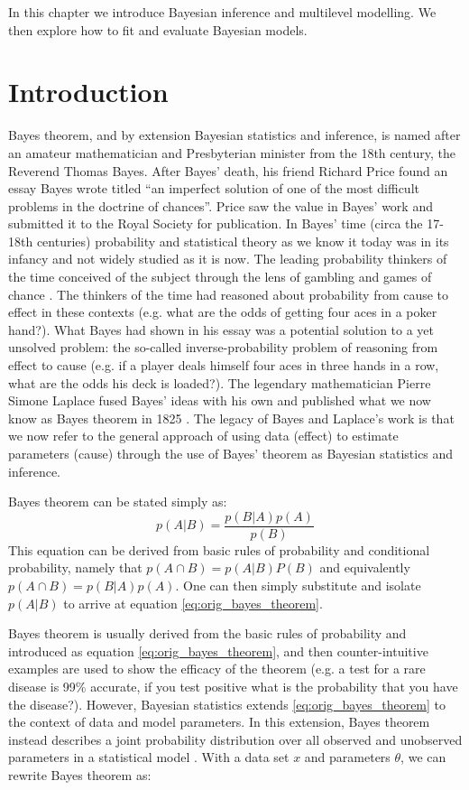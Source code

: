 In this chapter we introduce Bayesian inference and multilevel modelling. We then explore how to fit and evaluate Bayesian models.

\section{Introduction}

Bayes theorem, and by extension Bayesian statistics and inference, is named after an amateur mathematician and Presbyterian minister from the 18th century, the Reverend Thomas Bayes. After Bayes' death, his friend Richard Price found an essay Bayes wrote titled ``an imperfect solution of one of the most difficult problems in the doctrine of chances''. Price saw the value in Bayes' work and submitted it to the Royal Society for publication. In Bayes' time (circa the 17-18th centuries) probability and statistical theory as we know it today was in its infancy and not widely studied as it is now. The leading probability thinkers of the time conceived of the subject through the lens of gambling and games of chance \cite{David1998} \cite{Moivre1718}. The thinkers of the time had reasoned about probability from cause to effect in these contexts (e.g. what are the odds of getting four aces in a poker hand?). What Bayes had shown in his essay was a potential solution to a yet unsolved problem: the so-called inverse-probability problem of reasoning from effect to cause (e.g. if a player deals himself four aces in three hands in a row, what are the odds his deck is loaded?). The legendary mathematician Pierre Simone Laplace fused Bayes' ideas with his own and published what we now know as Bayes theorem in 1825 \cite{Stigler1986}. The legacy of Bayes and Laplace's work is that we now refer to the general approach of using data (effect) to estimate parameters (cause) through the use of Bayes' theorem as Bayesian statistics and inference.

Bayes theorem can be stated simply as:
\begin{equation} \label{eq:orig_bayes_theorem}
p(A|B) = \frac{p(B|A)p(A)}{p(B)}
\end{equation}
This equation can be derived from basic rules of probability and conditional probability, namely that $p(A \cap B) = p(A|B)P(B)$ and equivalently $p(A \cap B) = p(B|A)p(A)$. One can then simply substitute and isolate $p(A|B)$ to arrive at equation \ref{eq:orig_bayes_theorem}.

Bayes theorem is usually derived from the basic rules of probability and introduced as equation \ref{eq:orig_bayes_theorem}, and then counter-intuitive examples are used to show the efficacy of the theorem (e.g. a test for a rare disease is 99\% accurate, if you test positive what is the probability that you have the disease?). However, Bayesian statistics extends \ref{eq:orig_bayes_theorem} to the context of data and model parameters. In this extension, Bayes theorem instead describes a joint probability distribution over all observed and unobserved parameters in a statistical model \cite{Schoot2021}. With a data set $x$ and parameters $\theta$, we can rewrite Bayes theorem as:

